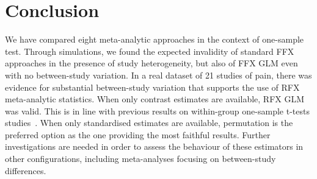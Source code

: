 \documentclass{llncs}
\begin{document}

    

\section{Conclusion}\label{sec_ccl}
We have compared eight meta-analytic approaches in the context of one-sample test. Through simulations, we found the expected invalidity of standard FFX approaches in the presence of study heterogeneity, but also of FFX GLM even with no between-study variation. In a real dataset of 21 studies of pain, there was evidence for substantial between-study variation that supports the use of RFX meta-analytic statistics. When only contrast estimates are available, RFX GLM was valid. This is in line with previous results on within-group one-sample t-tests studies~\cite{Mumford2009}. When only standardised estimates are available, permutation is the preferred option as the one providing the most faithful results. Further investigations are needed in order to assess the behaviour of these estimators in other configurations, including meta-analyses focusing on between-study differences.



%



\end{document}
